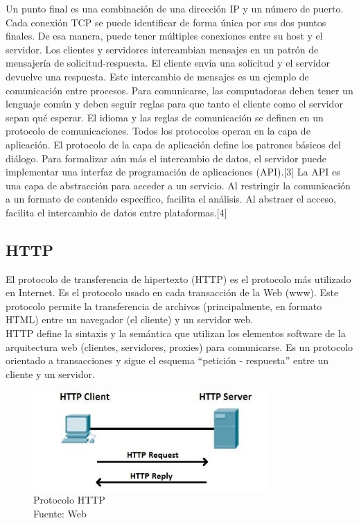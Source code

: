 Un punto final es una combinación de una dirección IP y un número de puerto. Cada conexión TCP se puede identificar de forma única por sus dos puntos finales. De esa manera, puede tener múltiples conexiones entre su host y el servidor.
Los clientes y servidores intercambian mensajes en un patrón de mensajería de solicitud-respuesta. El cliente envía una solicitud y el servidor devuelve una respuesta. Este intercambio de mensajes es un ejemplo de comunicación entre procesos. Para comunicarse, las computadoras deben tener un lenguaje común y deben seguir reglas para que tanto el cliente como el servidor sepan qué esperar. El idioma y las reglas de comunicación se definen en un protocolo de comunicaciones. Todos los protocolos operan en la capa de aplicación. El protocolo de la capa de aplicación define los patrones básicos del diálogo. Para formalizar aún más el intercambio de datos, el servidor puede implementar una interfaz de programación de aplicaciones (API).[3] La API es una capa de abstracción para acceder a un servicio. Al restringir la comunicación a un formato de contenido específico, facilita el análisis. Al abstraer el acceso, facilita el intercambio de datos entre plataformas.[4]
\subsection{HTTP}
El protocolo de transferencia de hipertexto (HTTP) es el protocolo más utilizado en Internet. Es el protocolo usado en cada transacción de la Web (www). Este protocolo permite la transferencia de archivos (principalmente, en formato HTML) entre un navegador (el cliente) y un servidor web.\\

HTTP define la sintaxis y la semántica que utilizan los elementos software de la arquitectura web (clientes, servidores, proxies) para comunicarse. Es un protocolo orientado a transacciones y sigue el esquema ``petición - respuesta'' entre un cliente y un servidor. 

\begin{figure}[H]
    \begin{center}
        \includegraphics[width=9cm]{img/capitulo_2/http1.jpg}
    \end{center}
    \caption{Protocolo HTTP\\Fuente: Web}
    \label{fig:sistema_video_vigilancia}
\end{figure}


